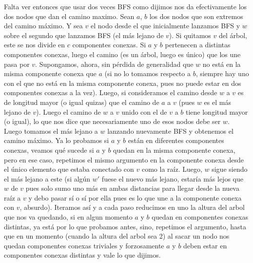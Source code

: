 \documentclass[A4paper,oneside,fleqn,11pt]{article}
\theoremstyle{definition}
\begin{document}
Falta ver entonces que usar dos veces BFS como dijimos nos da efectivamente los dos nodos que dan el camino maximo. Sean $a$, $b$ los dos nodos que son extremos del camino máximo. Y sea $v$ el nodo desde el que inicialmente lanzamos BFS y $w$ sobre el segundo que lanzamos BFS (el más lejano de $v$). Si quitamos $v$ del árbol, este se nos divide en $c$ componentes conexas. Si $a $ y $ b$ pertenecen a distintas componentes conexas, luego el camino (es un árbol, luego es único) que los une pasa por $v$. Supongamos, ahora, sin pérdida de generalidad que $w$ no está en la misma componente conexa que $a$ (si no lo tomamos respecto a $b$, siempre hay uno con el que no está en la misma componente conexa, pues no puede estar en dos componentes conexas a la vez). Luego, si consideramos el camino desde $w$ a $v$ es de longitud mayor (o igual quizas) que el camino de $a$ a $v$ (pues $w$ es el más lejano de $v$). Luego el camino de $w$ a $v$ unido con el de $v$ a $b$ tiene longitud mayor (o igual), lo que nos dice que necesariamente uno de esos nodos debe ser $w$. Luego tomamos el más lejano a $w$ lanzando nuevamente BFS y obtenemos el camino máximo. Ya lo probamos si $a$ y $b$ están en diferentes componentes conexas, veamos qué sucede si $a$ y $b$ quedan en la misma componente conexa, pero en ese caso, repetimos el mismo argumento en la componente conexa desde el único elemento que estaba conectado con $v$ como la raíz. Luego, $w$ sigue siendo el más lejano a este (si algún $w'$ fuese el nuevo más lejano, estaría más lejos que $w$ de $v$ pues solo sumo uno más en ambas distancias para llegar desde la nueva raíz a $v$ y debo pasar sí o sí por ella pues es lo que une a la componente conexa con $v$, absurdo). Iteramos así y a cada paso reducimos en uno la altura del arbol que nos va quedando, si en algun momento $a$ y $b$ quedan en componentes conexas distintas, ya está por lo que probamos antes, sino, repetimos el argumento, hasta que en un momento (cuando la altura del arbol sea 2) al sacar un nodo nos quedan componentes conexas triviales y forzosamente $a$ y $b$ deben estar en componentes conexas distintas y vale lo que dijimos.
\end{document}
